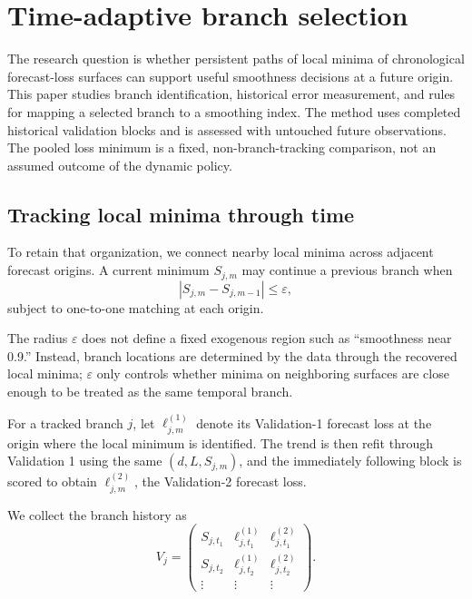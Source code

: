 \section{Time-adaptive branch selection}
\label{sec:optional_dynamic}

The research question is whether persistent paths of local minima of
chronological forecast-loss surfaces can support useful smoothness
decisions at a future origin. This paper studies branch identification,
historical error measurement, and rules for mapping a selected branch
to a smoothing index. The method uses completed historical validation
blocks and is assessed with untouched future observations.
The pooled loss minimum is a fixed, non-branch-tracking comparison,
not an assumed outcome of the dynamic policy.

\subsection{Tracking local minima through time}

To retain that organization, we connect nearby local minima across adjacent forecast origins. A current minimum $S_{j,m}$ may continue a previous branch when
\begin{equation}
\label{eq:epsilon_tracking}
|S_{j,m}-S_{j,m-1}|
\le
\varepsilon,
\end{equation}
subject to one-to-one matching at each origin.

The radius $\varepsilon$ does not define a fixed exogenous region such as ``smoothness near 0.9.'' Instead, branch locations are determined by the data through the recovered local minima; $\varepsilon$ only controls whether minima on neighboring surfaces are close enough to be treated as the same temporal branch.

For a tracked branch $j$, let $\ell^{(1)}_{j,m}$ denote its Validation-1 forecast loss at the origin where the local minimum is identified. The trend is then refit through Validation 1 using the same $(d,L,S_{j,m})$, and the immediately following block is scored to obtain $\ell^{(2)}_{j,m}$, the Validation-2 forecast loss.

We collect the branch history as
\begin{equation}
\label{eq:branch_matrix}
V_j
=
\begin{pmatrix}
S_{j,t_1} & \ell^{(1)}_{j,t_1} & \ell^{(2)}_{j,t_1}\\
S_{j,t_2} & \ell^{(1)}_{j,t_2} & \ell^{(2)}_{j,t_2}\\
\vdots & \vdots & \vdots
\end{pmatrix}.
\end{equation}

